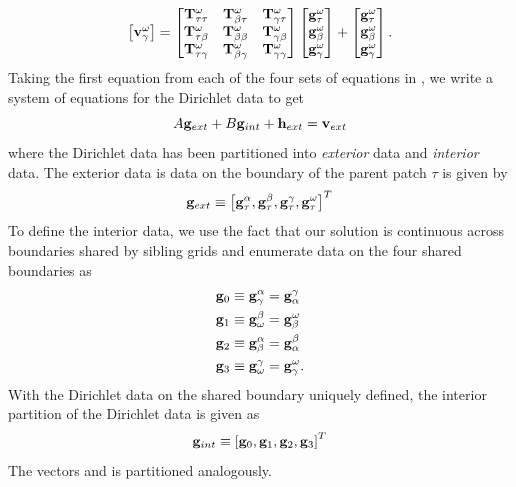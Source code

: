 \begin{equation}
\begin{aligned}
\begin{bmatrix}
        \mathbf v^{\omega}_{\gamma} \\
    \end{bmatrix}
    =
    \begin{bmatrix}
        \mathbf T^{\omega}_{\tau\tau}   & \mathbf T^{\omega}_{\beta\tau}   & \mathbf T^{\omega}_{\gamma\tau} \\
        \mathbf T^{\omega}_{\tau\beta}  & \mathbf T^{\omega}_{\beta\beta}  & \mathbf T^{\omega}_{\gamma\beta} \\
        \mathbf T^{\omega}_{\tau\gamma} & \mathbf T^{\omega}_{\beta\gamma} & \mathbf T^{\omega}_{\gamma\gamma} \\
    \end{bmatrix}
    \begin{bmatrix}
        \mathbf g^{\omega}_{\tau} \\
        \mathbf g^{\omega}_{\beta} \\
        \mathbf g^{\omega}_{\gamma} \\
    \end{bmatrix} +
    \begin{bmatrix}
        \mathbf g^{\omega}_{\tau} \\
        \mathbf g^{\omega}_{\beta} \\
        \mathbf g^{\omega}_{\gamma} \\
    \end{bmatrix}. \\
\end{aligned}
\label{eq:linalg_one}
\end{equation}
Taking the first equation from each of the four sets of equations in , we write a system of equations for the Dirichlet data to get
\begin{equation}
A\mathbf g_{ext} + B \mathbf g_{int} + \mathbf h_{ext} = \mathbf v_{ext}
\label{eq:sys_one}
\end{equation}
where the Dirichlet data has been partitioned into {\em exterior} data and {\em interior} data.  The exterior data is data on the boundary of the parent patch $\tau$ is given by
\begin{equation}
\mathbf g_{ext} \equiv \left[\mathbf g^{\alpha}_{\tau}, \mathbf g^{\beta}_{\tau} , \mathbf g^{\gamma}_{\tau}, \mathbf g^{\omega}_{\tau}\right]^T
\end{equation}
To define the interior data, we use the fact that our solution is continuous across boundaries shared by sibling grids and enumerate data on the four shared boundaries as
\begin{equation}
\begin{aligned}
\mathbf g_0 \equiv \mathbf g^{\alpha}_{\gamma} & = \mathbf g^{\gamma}_{\alpha}\\
\mathbf g_1 \equiv \mathbf g^{\beta}_{\omega} & = \mathbf g^{\omega}_{\beta}  \\
\mathbf g_2 \equiv \mathbf g^{\alpha}_{\beta} & = \mathbf g^{\beta}_{\alpha} \\
\mathbf g_3 \equiv \mathbf g^{\gamma}_{\omega} & = \mathbf g^{\omega}_{\gamma}.
\end{aligned}
\end{equation}
With the Dirichlet data on the shared boundary uniquely defined, the interior partition of the Dirichlet data is given as
\begin{equation}
\mathbf g_{int} \equiv \left[\mathbf g_0, \mathbf g_1, \mathbf g_2, \mathbf g_3\right]^T
\end{equation}
The vectors \vtau and \htau is partitioned analogously.

